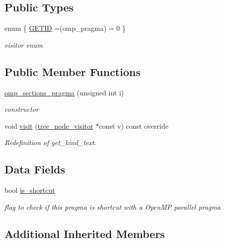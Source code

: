 \subsection*{Public Types}
\begin{DoxyCompactItemize}
\item 
enum \{ \hyperlink{structomp__sections__pragma_aed20d5958b7bae8b2e1b2d7898d1a665acdf9b4f69415ca70d0541dc8b8eb2212}{G\+E\+T\+ID} =(omp\+\_\+pragma) = 0
 \}\begin{DoxyCompactList}\small\item\em visitor enum \end{DoxyCompactList}
\end{DoxyCompactItemize}
\subsection*{Public Member Functions}
\begin{DoxyCompactItemize}
\item 
\hyperlink{structomp__sections__pragma_a0a41e53fe8ad062e26ae52ff69d6f7b2}{omp\+\_\+sections\+\_\+pragma} (unsigned int i)
\begin{DoxyCompactList}\small\item\em constructor \end{DoxyCompactList}\item 
void \hyperlink{structomp__sections__pragma_ae9dcb45b2796afc06a6b4e4233761837}{visit} (\hyperlink{classtree__node__visitor}{tree\+\_\+node\+\_\+visitor} $\ast$const v) const override
\begin{DoxyCompactList}\small\item\em Redefinition of get\+\_\+kind\+\_\+text. \end{DoxyCompactList}\end{DoxyCompactItemize}
\subsection*{Data Fields}
\begin{DoxyCompactItemize}
\item 
bool \hyperlink{structomp__sections__pragma_adab9900e4753c9a0bd0665af1449a8fb}{is\+\_\+shortcut}
\begin{DoxyCompactList}\small\item\em flag to check if this pragma is shortcut with a Open\+MP parallel pragma \end{DoxyCompactList}\end{DoxyCompactItemize}
\subsection*{Additional Inherited Members}



